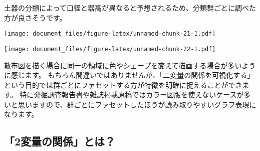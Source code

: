 \documentclass[]{article}
\newenvironment{Shaded}{\begin{snugshade}}{\end{snugshade}}
\newcommand{\CommentTok}[1]{\textcolor[rgb]{0.56,0.35,0.01}{\textit{#1}}}
\newcommand{\DataTypeTok}[1]{\textcolor[rgb]{0.13,0.29,0.53}{#1}}
\newcommand{\KeywordTok}[1]{\textcolor[rgb]{0.13,0.29,0.53}{\textbf{#1}}}
\newcommand{\NormalTok}[1]{#1}
\newcommand{\OperatorTok}[1]{\textcolor[rgb]{0.81,0.36,0.00}{\textbf{#1}}}
\newcommand{\StringTok}[1]{\textcolor[rgb]{0.31,0.60,0.02}{#1}}
\begin{document}
土器の分類によって口径と器高が異なると予想されるため、分類群ごとに調べた方が良さそうです。

\begin{Shaded}
\end{Shaded}

\texttt{[image: document\_files/figure-latex/unnamed-chunk-21-1.pdf]}

\begin{Shaded}
\end{Shaded}

\texttt{[image: document\_files/figure-latex/unnamed-chunk-22-1.pdf]}

散布図を描く場合に同一の領域に色やシェープを変えて描画する場合が多いように感じます。
もちろん間違いではありませんが、「二変量の関係を可視化する」という目的では群ごとにファセットする方が特徴を明確に捉えることができます。
特に発掘調査報告書や雑誌掲載原稿ではカラー図版を使えないケースが多いと思いますので、群ごとにファセットしたほうが読み取りやすいグラフ表現になります。

\subsection{「2変量の関係」とは？}
\end{document}
